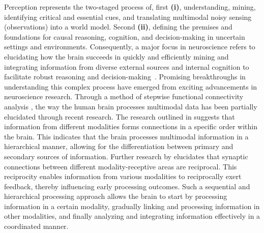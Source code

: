 \documentclass{article} %
\begin{document}
Perception represents the two-staged process of, first \textbf{(i)}, understanding, mining, identifying critical and essential cues, and translating multimodal noisy sensing (observations) into a world model. Second \textbf{(ii)}, defining the premises and foundations for causal reasoning, cognition, and decision-making in uncertain settings and environments. Consequently, a major focus in neuroscience refers to elucidating how the brain succeeds in quickly and efficiently mining and integrating information from diverse external sources and internal cognition to facilitate robust reasoning and decision-making~\citep{tononi1998complexity}.
Promising breakthroughs in understanding this complex process have emerged from exciting advancements in neuroscience research. 
Through a method of stepwise functional connectivity analysis \citep{Sepulcre10649}, the way the human brain processes multimodal data has been partially elucidated through recent research.
The research outlined in \citet{pascual2001metamodal,meunier2009hierarchical,zhang2019discovering, raut2020hierarchical} suggests that information from different modalities forms connections in a specific order within the brain. This indicates that the brain processes multimodal information in a hierarchical manner, allowing for the differentiation between primary and secondary sources of information.
Further research by \citep{Mesulam1998, Pierre2000} elucidates that synaptic connections between different modality-receptive areas are reciprocal. This reciprocity enables information from various modalities to reciprocally exert feedback, thereby influencing early processing outcomes. Such a sequential and hierarchical processing approach allows the brain to start by processing information in a certain modality, gradually linking and processing information in other modalities, and finally analyzing and integrating information effectively in a coordinated manner. 
\end{document}
